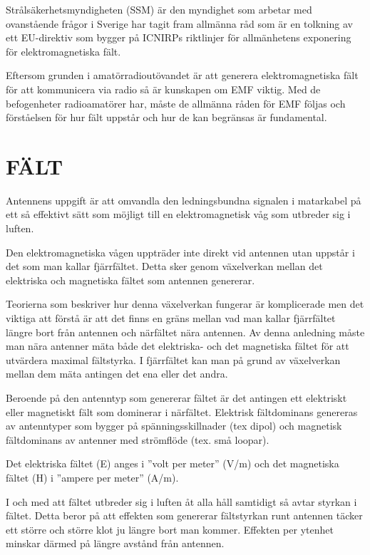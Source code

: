 Strålsäkerhetsmyndigheten (SSM) är den myndighet som arbetar med
ovanstående frågor i Sverige har tagit fram allmänna råd som är
en tolkning av ett EU-direktiv som bygger på ICNIRPs riktlinjer för
allmänhetens exponering för elektromagnetiska fält.

Eftersom grunden i amatörradioutövandet är att generera
elektromagnetiska fält för att kommunicera via radio så är kunskapen
om EMF viktig. Med de befogenheter radioamatörer har, måste de
allmänna råden för EMF följas och förståelsen för hur fält uppstår
och hur de kan begränsas är fundamental.

\section{FÄLT}
Antennens uppgift är att omvandla den ledningsbundna signalen i
matarkabel på ett så effektivt sätt som möjligt till en
elektromagnetisk våg som utbreder sig i luften.

Den elektromagnetiska vågen uppträder inte direkt vid antennen utan
uppstår i det som man kallar fjärrfältet. Detta sker genom växelverkan
mellan det elektriska och magnetiska fältet som antennen genererar.

Teorierna som beskriver hur denna växelverkan fungerar är komplicerade
men det viktiga att förstå är att det finns en gräns mellan vad man
kallar fjärrfältet längre bort från antennen och närfältet nära
antennen. Av denna anledning måste man nära antenner mäta både det
elektriska- och det magnetiska fältet för att utvärdera maximal fältstyrka.
I fjärrfältet kan man på grund av växelverkan mellan dem
mäta antingen det ena eller det andra.

Beroende på den antenntyp som genererar fältet är det antingen ett
elektriskt eller magnetiskt fält som dominerar i närfältet.
Elektrisk fältdominans genereras av antenntyper som bygger på
spänningsskillnader (tex dipol) och magnetisk fältdominans av antenner
med strömflöde (tex. små loopar).

Det elektriska fältet (E) anges i ”volt per meter” (V/m) och det
magnetiska fältet (H) i ”ampere per meter” (A/m).

I och med att fältet utbreder sig i luften åt alla håll samtidigt så
avtar styrkan i fältet. Detta beror på att effekten som genererar
fältstyrkan runt antennen täcker ett större och större klot ju
längre bort man kommer. Effekten per ytenhet minskar därmed på
längre avstånd från antennen.

